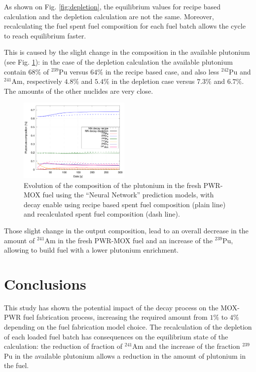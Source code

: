 \documentclass{anstrans}
\begin{document}
As shown on Fig. \ref{fig:depletion}, the equilibrium values for recipe based
calculation and the depletion calculation are not the same. Moreover,
recalculating the fuel spent fuel composition for each fuel batch allows the
cycle to reach equilibrium faster.

This is caused by the slight change in the composition in the available
plutonium (see Fig. \ref{fig:depletioncompo}): in the case of the depletion
calculation the available plutonium contain $68\%$ of $^{239}$Pu versus $64\%$
in the recipe based case, and also less $^{242}$Pu and $^{241}$Am, respectively
$4.8\%$ and $5.4\%$ in the depletion case versus $7.3\%$ and $6.7\%$. The
amounts of the other nuclides are very close.


\begin{figure}[ht] %
  \centering
  \includegraphics[width=0.48\textwidth]{MOX_pu_composition.png}
  \caption{Evolution of the composition of the plutonium in the fresh PWR-MOX fuel
  using the ``Neural Network'' prediction models, with decay enable using recipe
  based spent fuel composition (plain line) and recalculated spent fuel
  composition (dash line).}
  \label{fig:depletioncompo}
\end{figure}

Those slight change in the output composition, lead to an overall decrease in
the amount of $^{241}$Am in the fresh PWR-MOX fuel and an increase of the
$^{239}$Pu, allowing to build fuel with a lower plutonium enrichment.


\section{Conclusions}

This study has shown the potential impact of the decay process on the MOX-PWR fuel
fabrication process, increasing the required amount from $1\%$ to $4\%$
depending on the fuel fabrication model choice. The recalculation of the 
depletion of each loaded fuel batch has consequences on the equilibrium
state of the calculation: the reduction of fraction of $^{241}$Am and the increase of the
fraction $^{239}$Pu in the available plutonium allows a reduction in the amount of
plutonium in the fuel.
\end{document}
